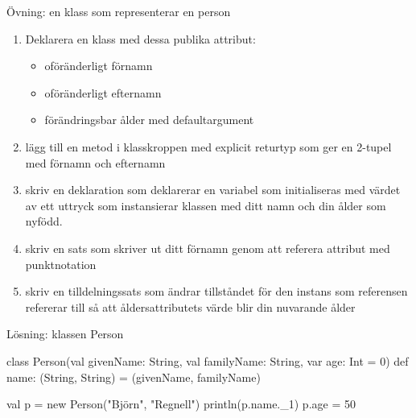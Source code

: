 \begin{Slide}{Övning: en klass som representerar en person}
\begin{enumerate}
  \item Deklarera en klass  med dessa publika attribut:
  \begin{itemize}
    \item oföränderligt förnamn
    \item oföränderligt efternamn
    \item förändringsbar ålder med defaultargument 
  \end{itemize}
  \item lägg till en metod i klasskroppen med explicit returtyp som ger en 2-tupel med förnamn och efternamn
  \item skriv en deklaration som deklarerar en variabel  som initialiseras med värdet av ett uttryck som instansierar klassen  med ditt namn och din ålder som nyfödd.
  \item skriv en sats som skriver ut ditt förnamn genom att referera attribut med punktnotation
  \item skriv en tilldelningssats som ändrar tillståndet för den instans som referensen  refererar till så att åldersattributets värde blir din nuvarande ålder
\end{enumerate}
\end{Slide}



\begin{Slide}{Lösning: klassen Person}
\begin{Code}[basicstyle=\SlideFontSize{6.9}{9}\ttfamily]
class Person(val givenName: String, val familyName: String, var age: Int = 0){
  def name: (String, String) = (givenName, familyName)
}
\end{Code}
\begin{REPLnonum}[basicstyle=\SlideFontSize{7}{9}\ttfamily\color{white}]
val p = new Person("Björn", "Regnell")
println(p.name._1)
p.age = 50
\end{REPLnonum}
\end{Slide}


